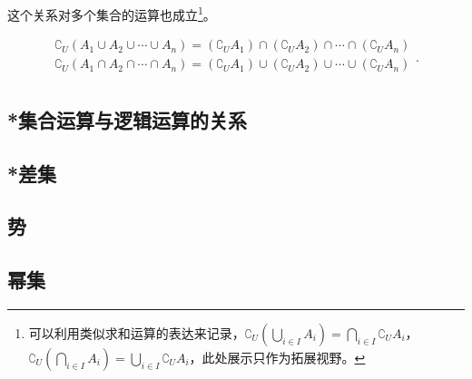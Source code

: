 这个关系对多个集合的运算也成立\footnote{可以利用类似求和运算的表达来记录，$\displaystyle\complement_U(\bigcup_{i\in I} A_i)=\bigcap_{i\in I} {\complement_UA_i}$，$\displaystyle\complement_U(\bigcap_{i\in I} A_i)=\bigcup_{i\in I} {\complement_UA_i}$，此处展示只作为拓展视野。}。

\begin{equation}
\begin{array}{c} 
\displaystyle
\complement_U(A_1\cup A_2\cup\cdots\cup A_n)=(\complement_UA_1)\cap (\complement_UA_2)\cap\cdots\cap(\complement_UA_n)\\  
\displaystyle
\complement_U(A_1\cap A_2\cap\cdots\cap A_n)=(\complement_UA_1)\cup (\complement_UA_2)\cup\cdots\cup(\complement_UA_n)\\  
\end{array}.~
\end{equation}


\subsection{*集合运算与逻辑运算的关系}



\subsection{*差集}
\subsection{势}
\subsection{幂集}
